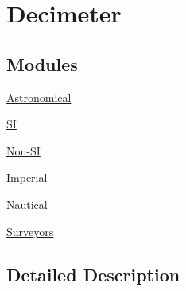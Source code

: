 \hypertarget{group___e_g_x_math-_conversions-_length_conversions-_s_i-_decimeter}{}\section{Decimeter}
\label{group___e_g_x_math-_conversions-_length_conversions-_s_i-_decimeter}
\subsection*{Modules}
\begin{DoxyCompactItemize}
\item 
\mbox{\hyperlink{group___e_g_x_math-_conversions-_length_conversions-_s_i-_decimeter-_astronomical}{Astronomical}}
\item 
\mbox{\hyperlink{group___e_g_x_math-_conversions-_length_conversions-_s_i-_decimeter-_s_i}{SI}}
\item 
\mbox{\hyperlink{group___e_g_x_math-_conversions-_length_conversions-_s_i-_decimeter-_non-_s_i}{Non-\/\+SI}}
\item 
\mbox{\hyperlink{group___e_g_x_math-_conversions-_length_conversions-_s_i-_decimeter-_imperial}{Imperial}}
\item 
\mbox{\hyperlink{group___e_g_x_math-_conversions-_length_conversions-_s_i-_decimeter-_nautical}{Nautical}}
\item 
\mbox{\hyperlink{group___e_g_x_math-_conversions-_length_conversions-_s_i-_decimeter-_surveyors}{Surveyors}}
\end{DoxyCompactItemize}


\subsection{Detailed Description}

